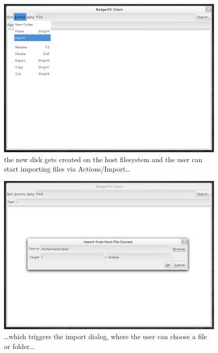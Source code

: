 \begin{figure}[h!]
\centering
\includegraphics[width=1\textwidth]{figures/03_quickstart.png}
\caption{the new disk gets created on the host filesystem and the user can
start importing files via Actions/Import\ldots}
\label{fig:03_quickstart}
\end{figure}

\begin{figure}[h!]
\centering
\includegraphics[width=1\textwidth]{figures/04_quickstart.png}
\caption{\ldots which triggers the import dialog, where the user can choose a
file or folder\ldots}
\label{fig:04_quickstart}
\end{figure}

